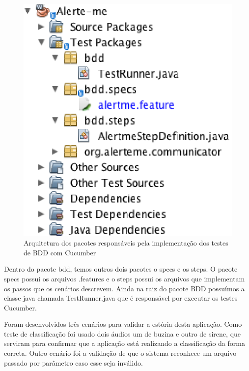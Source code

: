 \begin{figure}[H]
	\centering
	\captionsetup{justification=centering,margin=2cm}
	\includegraphics[scale=0.65]{capitulos/validacao/figuras/arquiteturaDeBddComCucumber.eps}
	\caption{Arquitetura dos pacotes responsáveis pela implementação dos testes de BDD com Cucumber}
	\label{fig:result-engajamento}
\end{figure}

Dentro do pacote bdd, temos outros dois pacotes o specs e os steps. O pacote specs possui os arquivos .features e o steps possui os arquivos que implementam os passos que os cenários descrevem. Ainda na raiz do pacote BDD possuímos a classe java chamada TestRunner.java que é responsável por executar os testes Cucumber.

Foram desenvolvidos três cenários para validar a estória desta aplicação. Como teste de classificação foi usado dois áudios um de buzina e outro de sirene, que serviram para confirmar que a aplicação está realizando a classificação da forma correta. Outro cenário foi a validação de que o sistema reconhece um arquivo passado por parâmetro caso esse seja inválido.


